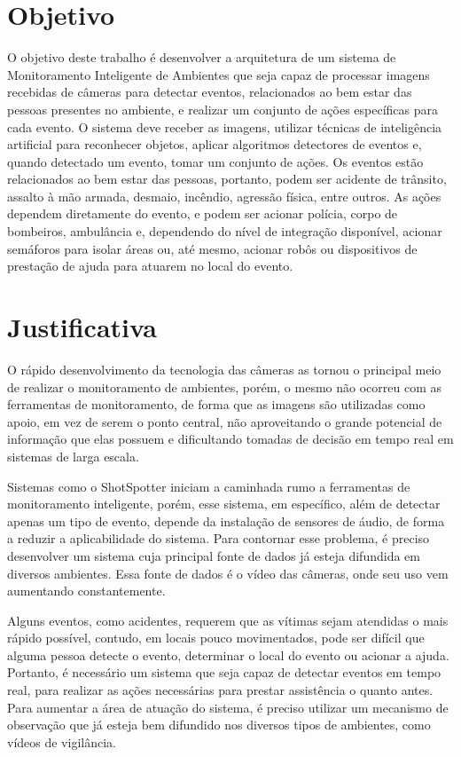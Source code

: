 \documentclass[]{politex}
\begin{document}
\section{Objetivo}
O objetivo deste trabalho é desenvolver a arquitetura de um sistema de Monitoramento Inteligente de Ambientes que seja capaz de processar imagens recebidas de câmeras para detectar eventos, relacionados ao bem estar das pessoas presentes no ambiente, e realizar um conjunto de ações específicas para cada evento. O sistema deve receber as imagens, utilizar técnicas de inteligência artificial para reconhecer objetos, aplicar algoritmos detectores de eventos e, quando detectado um evento, tomar um conjunto de ações. Os eventos estão relacionados ao bem estar das pessoas, portanto, podem ser acidente de trânsito, assalto à mão armada, desmaio, incêndio, agressão física, entre outros. As ações dependem diretamente do evento, e podem ser acionar polícia, corpo de bombeiros, ambulância e, dependendo do nível de integração disponível, acionar semáforos para isolar áreas ou, até mesmo, acionar robôs ou dispositivos de prestação de ajuda para atuarem no local do evento.

\section{Justificativa}
O rápido desenvolvimento da tecnologia das câmeras as tornou o principal meio de realizar o monitoramento de ambientes, porém, o mesmo não ocorreu com as ferramentas de monitoramento, de forma que as imagens são utilizadas como apoio, em vez de serem o ponto central, não aproveitando o grande potencial de informação que elas possuem e dificultando tomadas de decisão em tempo real em sistemas de larga escala.

Sistemas como o ShotSpotter iniciam a caminhada rumo a ferramentas de monitoramento inteligente, porém, esse sistema, em específico, além de detectar apenas um tipo de evento, depende da instalação de sensores de áudio, de forma a reduzir a aplicabilidade do sistema. Para contornar esse problema, é preciso desenvolver um sistema cuja principal fonte de dados já esteja difundida em diversos ambientes. Essa fonte de dados é o vídeo das câmeras, onde seu uso vem aumentando constantemente.

Alguns eventos, como acidentes, requerem que as vítimas sejam atendidas o mais rápido possível, contudo, em locais pouco movimentados, pode ser difícil que alguma pessoa detecte o evento, determinar o local do evento ou acionar a ajuda. Portanto, é necessário um sistema que seja capaz de detectar eventos em tempo real, para realizar as ações necessárias para prestar assistência o quanto antes. Para aumentar a área de atuação do sistema, é preciso utilizar um mecanismo de observação que já esteja bem difundido nos diversos tipos de ambientes, como vídeos de vigilância.
\end{document}
